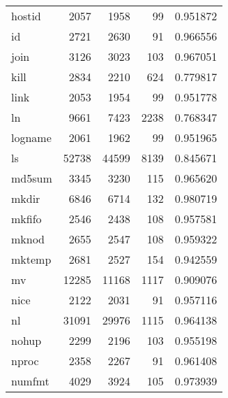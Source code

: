 \begin{longtable}{lrrrr}
hostid    &                     2057 &         1958 &            99 &                 0.951872 \\
id        &                     2721 &         2630 &            91 &                 0.966556 \\
join      &                     3126 &         3023 &           103 &                 0.967051 \\
kill      &                     2834 &         2210 &           624 &                 0.779817 \\
link      &                     2053 &         1954 &            99 &                 0.951778 \\
ln        &                     9661 &         7423 &          2238 &                 0.768347 \\
logname   &                     2061 &         1962 &            99 &                 0.951965 \\
ls        &                    52738 &        44599 &          8139 &                 0.845671 \\
md5sum    &                     3345 &         3230 &           115 &                 0.965620 \\
mkdir     &                     6846 &         6714 &           132 &                 0.980719 \\
mkfifo    &                     2546 &         2438 &           108 &                 0.957581 \\
mknod     &                     2655 &         2547 &           108 &                 0.959322 \\
mktemp    &                     2681 &         2527 &           154 &                 0.942559 \\
mv        &                    12285 &        11168 &          1117 &                 0.909076 \\
nice      &                     2122 &         2031 &            91 &                 0.957116 \\
nl        &                    31091 &        29976 &          1115 &                 0.964138 \\
nohup     &                     2299 &         2196 &           103 &                 0.955198 \\
nproc     &                     2358 &         2267 &            91 &                 0.961408 \\
numfmt    &                     4029 &         3924 &           105 &                 0.973939 \\

\end{longtable}
